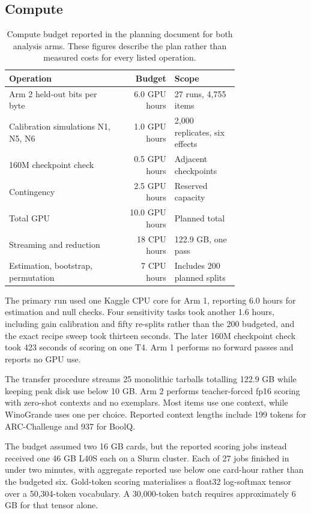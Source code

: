 \subsection{Compute}
\begin{table}[!htb]
\centering
\caption{Compute budget reported in the planning document for both analysis arms. These figures describe the plan rather than measured costs for every listed operation.}
\label{tab:original15}
\small\setlength{\tabcolsep}{4pt}\renewcommand{\arraystretch}{1.12}
\begin{tabular}{L{0.48\linewidth}rL{0.28\linewidth}}\toprule
Operation & Budget & Scope\\\midrule
Arm 2 held-out bits per byte & 6.0 GPU hours & 27 runs, 4,755 items\\
Calibration simulations N1, N5, N6 & 1.0 GPU hours & 2,000 replicates, six effects\\
160M checkpoint check & 0.5 GPU hours & Adjacent checkpoints\\
Contingency & 2.5 GPU hours & Reserved capacity\\
Total GPU & 10.0 GPU hours & Planned total\\
Streaming and reduction & 18 CPU hours & 122.9 GB, one pass\\
Estimation, bootstrap, permutation & 7 CPU hours & Includes 200 planned splits\\\bottomrule
\end{tabular}
\end{table}

The primary run used one Kaggle CPU core for Arm 1, reporting 6.0 hours for estimation and null checks. Four sensitivity tasks took another 1.6 hours, including gain calibration and fifty re-splits rather than the 200 budgeted, and the exact recipe sweep took thirteen seconds. The later 160M checkpoint check took 423 seconds of scoring on one T4. Arm 1 performs no forward passes and reports no GPU use.

The transfer procedure streams 25 monolithic tarballs totalling 122.9 GB while keeping peak disk use below 10 GB. Arm 2 performs teacher-forced fp16 scoring with zero-shot contexts and no exemplars. Most items use one context, while WinoGrande uses one per choice. Reported context lengths include 199 tokens for ARC-Challenge and 937 for BoolQ.

The budget assumed two 16 GB cards, but the reported scoring jobs instead received one 46 GB L40S each on a Slurm cluster. Each of 27 jobs finished in under two minutes, with aggregate reported use below one card-hour rather than the budgeted six. Gold-token scoring materialises a float32 log-softmax tensor over a 50,304-token vocabulary. A 30,000-token batch requires approximately 6 GB for that tensor alone.

